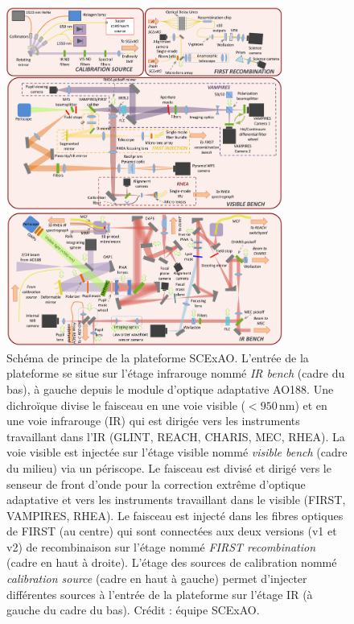 \begin{figure}[ht!]
    \centering
    \includegraphics[width=0.81\textwidth]{Figure_Chap5/20230212_FullBench.pdf}
    \caption[Schéma de principe de la plateforme SCExAO.]{Schéma de principe de la plateforme SCExAO. L'entrée de la plateforme se situe sur l'étage infrarouge nommé \textit{IR bench} (cadre du bas), à gauche depuis le module d'optique adaptative AO188. Une dichroïque divise le faisceau en une voie visible ($< 950 \,$nm) et en une voie infrarouge (IR) qui est dirigée vers les instruments travaillant dans l'IR (GLINT, REACH, CHARIS, MEC, RHEA). La voie visible est injectée sur l'étage visible nommé \textit{visible bench} (cadre du milieu) via un périscope. Le faisceau est divisé et dirigé vers le senseur de front d'onde pour la correction extrême d'optique adaptative et vers les instruments travaillant dans le visible (FIRST, VAMPIRES, RHEA). Le faisceau est injecté dans les fibres optiques de FIRST (au centre) qui sont connectées aux deux versions (v1 et v2) de recombinaison sur l'étage nommé \textit{FIRST recombination} (cadre en haut à droite). L'étage des sources de calibration nommé \textit{calibration source} (cadre en haut à gauche) permet d'injecter différentes sources à l'entrée de la plateforme sur l'étage IR (à gauche du cadre du bas). Crédit : équipe SCExAO.}
    \label{fig:SCExAOScheme}
\end{figure}

